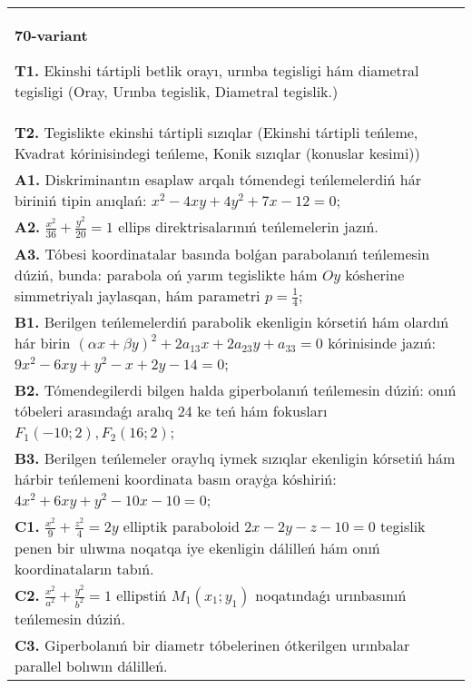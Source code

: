 \documentclass{article}
\begin{document}
\begin{tabular}{m{17cm}}
\textbf{70-variant}
\newline

\textbf{T1.} Ekinshi tártipli betlik orayı, urınba tegisligi hám diametral tegisligi (Oray, Urınba tegislik, Diametral tegislik.) \\
\textbf{T2.} Tegislikte ekinshi tártipli sızıqlar (Ekinshi tártipli teńleme, Kvadrat kórinisindegi teńleme, Konik sızıqlar (konuslar kesimi)) \\
\textbf{A1.} Diskriminantın esaplaw arqalı tómendegi teńlemelerdiń hár biriniń tipin anıqlań: $x^2-4 x y+4 y^2+7 x-12=0$; \\
\textbf{A2.} $\frac{x^2}{36}+\frac{y^2}{20}=1$ ellips direktrisalarınıń teńlemelerin jazıń. \\
\textbf{A3.} Tóbesi koordinatalar basında bolǵan parabolanıń teńlemesin dúziń, bunda: parabola oń yarım tegislikte hám $Oy$ kósherine simmetriyalı jaylasqan, hám parametri $p=\frac{1}{4}$; \\
\textbf{B1.} Berilgen teńlemelerdiń parabolik ekenligin kórsetiń hám olardıń hár birin $(\alpha x+\beta y)^2+2 a_{13} x+2 a_{23} y+a_{33}=0$ kórinisinde jazıń: $9 x^2-6 x y+y^2-x+2 y-14=0$; \\
\textbf{B2.} Tómendegilerdi bilgen halda giperbolanıń teńlemesin dúziń: onıń tóbeleri arasındaǵı aralıq 24 ke teń hám fokusları $F_1 (-10; 2), F_2 (16; 2) $; \\
\textbf{B3.} Berilgen teńlemeler oraylıq iymek sızıqlar ekenligin kórsetiń hám hárbir teńlemeni koordinata basın orayģa kóshiriń: $4 x^2+6 x y+y^2-10 x-10=0$; \\
\textbf{C1.} $\frac{x^2}{9}+\frac{z^2}{4}=2 y$ elliptik paraboloid $2 x-2 y-z-10=0$ tegislik penen bir ulıwma noqatqa iye ekenligin dálilleń hám onıń koordinataların tabıń. \\
\textbf{C2.} $\frac{x^2}{a^2}+\frac{y^2}{b^2}=1$ ellipstiń $M_1 (x_1; y_1) $ noqatındaǵı urınbasınıń teńlemesin dúziń. \\
\textbf{C3.} Giperbolanıń bir diametr tóbelerinen ótkerilgen urınbalar parallel bolıwın dálilleń. \\

\end{tabular}
\vspace{1cm}
\end{document}
